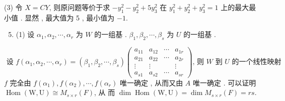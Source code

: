\documentclass[10pt]{article}
\begin{document}
(3)  令  $X=C Y$,  则原问题等价于求  $-y_{1}^{2}-y_{2}^{2}+5 y_{3}^{2}$  在  $y_{1}^{2}+y_{2}^{2}+y_{3}^{2}=1$  上的最大最小值 .  显然 ,  最大值为  5 ,  最小值为  $-1$.

\begin{enumerate}
  \setcounter{enumi}{4}
  \item (1)  设  $\alpha_{1}, \alpha_{2}, \cdots, \alpha_{r}$  为  $W$  的一组基 . $\beta_{1}, \beta_{2}, \cdots, \beta_{s}$  为  $U$  的一组基 .
\end{enumerate}
$$
\text { 设 } f\left(\alpha_{1}, \alpha_{2}, \cdots, \alpha_{r}\right)=\left(\beta_{1}, \beta_{2}, \cdots, \beta_{s}\right)\left(\begin{array}{rrrr}
a_{11} & a_{12} & \cdots & a_{1 r} \\
a_{21} & a_{22} & \cdots & a_{2 r} \\
\vdots & \vdots & & \vdots \\
a_{s 1} & a_{s 2} & \cdots & a_{s r}
\end{array}\right) \text {, 则 } W \text { 到 } U \text { 的一个线性映射 }
$$
$f$  完全由  $f\left(\alpha_{1}\right), f\left(\alpha_{2}\right), \cdots, f\left(\alpha_{r}\right)$  唯一确定 ,  从而又由  $A$  唯一确定 .  可以证明  $\operatorname{Hom}(\mathrm{W}, \mathrm{U}) \cong M_{s \times r}(F)$,  从   而  $\operatorname{dim} \operatorname{Hom}(\mathrm{W}, \mathrm{U})=\operatorname{dim} M_{s \times r}(F)=r s$.
\end{document}
